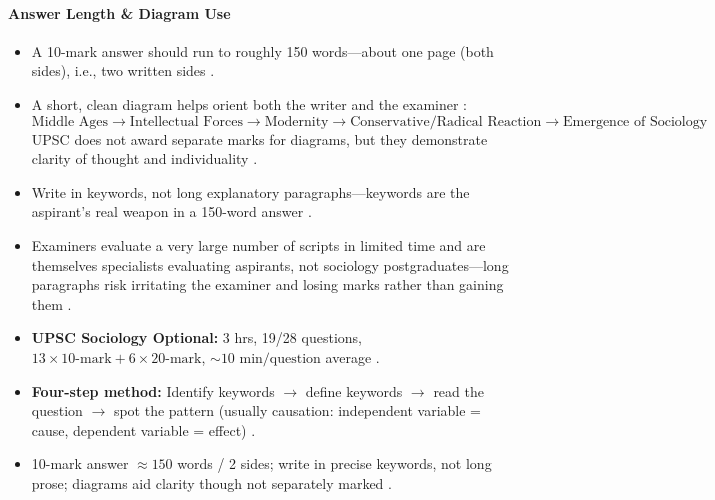 \paragraph{Answer Length \& Diagram Use}
\begin{itemize}
    \item A 10-mark answer should run to roughly 150 words---about one page (both sides), i.e., two written sides .
    \item A short, clean diagram helps orient both the writer and the examiner :
    $$\text{Middle Ages} \longrightarrow \text{Intellectual Forces} \longrightarrow \text{Modernity} \longrightarrow \text{Conservative/Radical Reaction} \longrightarrow \text{Emergence of Sociology}$$
    UPSC does not award separate marks for diagrams, but they demonstrate clarity of thought and individuality .
\end{itemize}

\begin{CriticalPoint}
\begin{itemize}
    \item Write in keywords, not long explanatory paragraphs---keywords are the aspirant's real weapon in a 150-word answer .
    \item Examiners evaluate a very large number of scripts in limited time and are themselves specialists evaluating aspirants, not sociology postgraduates---long paragraphs risk irritating the examiner and losing marks rather than gaining them .
\end{itemize}
\end{CriticalPoint}

\begin{QuickRevision}
\begin{itemize}
    \item \textbf{UPSC Sociology Optional:} 3 hrs, 19/28 questions, $13 \times 10\text{-mark} + 6 \times 20\text{-mark}$, $\sim 10\text{ min/question}$ average .
    \item \textbf{Four-step method:} Identify keywords $\rightarrow$ define keywords $\rightarrow$ read the question $\rightarrow$ spot the pattern (usually causation: independent variable = cause, dependent variable = effect) .
    \item 10-mark answer $\approx 150$ words / 2 sides; write in precise keywords, not long prose; diagrams aid clarity though not separately marked .
\end{itemize}
\end{QuickRevision}


